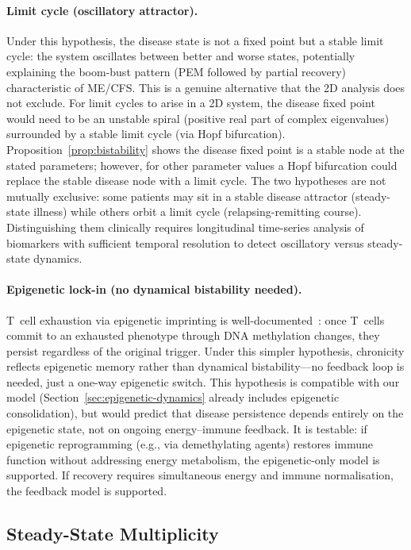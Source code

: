 \paragraph{Limit cycle (oscillatory attractor).} Under this hypothesis, the disease state is not a fixed point but a stable limit cycle: the system oscillates between better and worse states, potentially explaining the boom-bust pattern (PEM followed by partial recovery) characteristic of ME/CFS. This is a genuine alternative that the 2D analysis does not exclude. For limit cycles to arise in a 2D system, the disease fixed point would need to be an unstable spiral (positive real part of complex eigenvalues) surrounded by a stable limit cycle (via Hopf bifurcation). Proposition~\ref{prop:bistability} shows the disease fixed point is a stable node at the stated parameters; however, for other parameter values a Hopf bifurcation could replace the stable disease node with a limit cycle. The two hypotheses are not mutually exclusive: some patients may sit in a stable disease attractor (steady-state illness) while others orbit a limit cycle (relapsing-remitting course). Distinguishing them clinically requires longitudinal time-series analysis of biomarkers with sufficient temporal resolution to detect oscillatory versus steady-state dynamics.

\paragraph{Epigenetic lock-in (no dynamical bistability needed).} T~cell exhaustion via epigenetic imprinting is well-documented~\cite{Pauken2016epigenetic}: once T~cells commit to an exhausted phenotype through DNA methylation changes, they persist regardless of the original trigger. Under this simpler hypothesis, chronicity reflects epigenetic memory rather than dynamical bistability---no feedback loop is needed, just a one-way epigenetic switch. This hypothesis is compatible with our model (Section~\ref{sec:epigenetic-dynamics} already includes epigenetic consolidation), but would predict that disease persistence depends entirely on the epigenetic state, not on ongoing energy--immune feedback. It is testable: if epigenetic reprogramming (e.g., via demethylating agents) restores immune function without addressing energy metabolism, the epigenetic-only model is supported. If recovery requires simultaneous energy and immune normalisation, the feedback model is supported.

\subsection{Steady-State Multiplicity}

